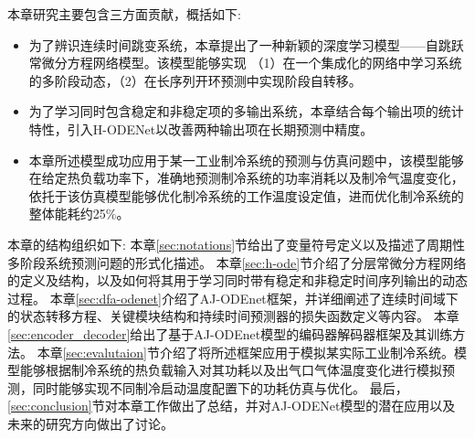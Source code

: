 本章研究主要包含三方面贡献，概括如下:
\begin{itemize}
    \item 为了辨识连续时间跳变系统，本章提出了一种新颖的深度学习模型——自跳跃常微分方程网络模型。该模型能够实现
    （1）在一个集成化的网络中学习系统的多阶段动态，（2）在长序列开环预测中实现阶段自转移。
    \item 为了学习同时包含稳定和非稳定项的多输出系统，本章结合每个输出项的统计特性，引入H-ODENet以改善两种输出项在长期预测中精度。
    \item 本章所述模型成功应用于某一工业制冷系统的预测与仿真问题中，该模型能够在给定热负载功率下，准确地预测制冷系统的功率消耗以及制冷气温度变化，依托于该仿真模型能够优化制冷系统的工作温度设定值，进而优化制冷系统的整体能耗约25\%。
    
\end{itemize}

本章的结构组织如下:
本章\ref{sec:notations}节给出了变量符号定义以及描述了周期性多阶段系统预测问题的形式化描述。
本章\ref{sec:h-ode}节介绍了分层常微分方程网络的定义及结构，以及如何将其用于学习同时带有稳定和非稳定时间序列输出的动态过程。
本章\ref{sec:dfa-odenet}介绍了AJ-ODEnet框架，并详细阐述了连续时间域下的状态转移方程、关键模块结构和持续时间预测器的损失函数定义等内容。
本章\ref{sec:encoder_decoder}给出了基于AJ-ODEnet模型的编码器解码器框架及其训练方法。
本章\ref{sec:evalutaion}节介绍了将所述框架应用于模拟某实际工业制冷系统。模型能够根据制冷系统的热负载输入对其功耗以及出气口气体温度变化进行模拟预测，同时能够实现不同制冷启动温度配置下的功耗仿真与优化。
最后，\ref{sec:conclusion}节对本章工作做出了总结，并对AJ-ODENet模型的潜在应用以及未来的研究方向做出了讨论。


